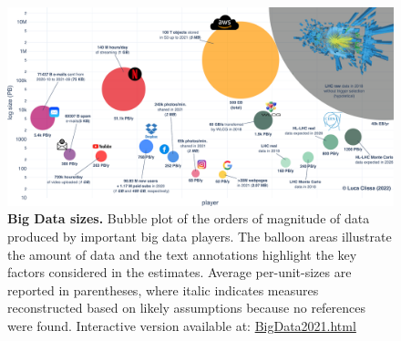 \begin{landscape}
\begin{figure}
    \centering
    \includegraphics[width=\linewidth]{figures/220_introduction/BigData2021.pdf}
    \caption{\textbf{Big Data sizes.} Bubble plot of the orders of magnitude of data produced by important big data players. The balloon areas illustrate the amount of data and the text annotations highlight the key factors considered in the estimates. Average per-unit-sizes are reported in parentheses, where italic indicates measures reconstructed based on likely assumptions because no references were found. Interactive version available at: \href{https://clissa.github.io/BigData2021/BigData2021.html}{BigData2021.html}}
    \label{fig:bidata_size}
\end{figure}
\end{landscape}

